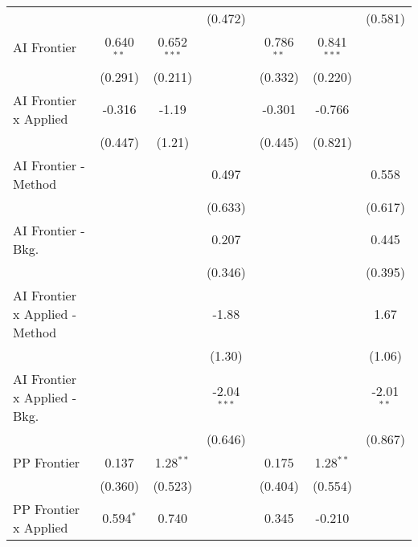 \begin{tabular}{lcccccc}
                                  &              &               & (0.472)       &               &               & (0.581)\\   
   AI Frontier                    & 0.640$^{**}$ & 0.652$^{***}$ &               & 0.786$^{**}$  & 0.841$^{***}$ &   \\   
                                  & (0.291)      & (0.211)       &               & (0.332)       & (0.220)       &   \\   
   AI Frontier x Applied          & -0.316       & -1.19         &               & -0.301        & -0.766        &   \\   
                                  & (0.447)      & (1.21)        &               & (0.445)       & (0.821)       &   \\   
   AI Frontier - Method           &              &               & 0.497         &               &               & 0.558\\   
                                  &              &               & (0.633)       &               &               & (0.617)\\   
   AI Frontier - Bkg.             &              &               & 0.207         &               &               & 0.445\\   
                                  &              &               & (0.346)       &               &               & (0.395)\\   
   AI Frontier x Applied - Method &              &               & -1.88         &               &               & 1.67\\   
                                  &              &               & (1.30)        &               &               & (1.06)\\   
   AI Frontier x Applied - Bkg.   &              &               & -2.04$^{***}$ &               &               & -2.01$^{**}$\\   
                                  &              &               & (0.646)       &               &               & (0.867)\\   
   PP Frontier                    & 0.137        & 1.28$^{**}$   &               & 0.175         & 1.28$^{**}$   &   \\   
                                  & (0.360)      & (0.523)       &               & (0.404)       & (0.554)       &   \\   
   PP Frontier x Applied          & 0.594$^{*}$  & 0.740         &               & 0.345         & -0.210        &   \\   

\end{tabular}
